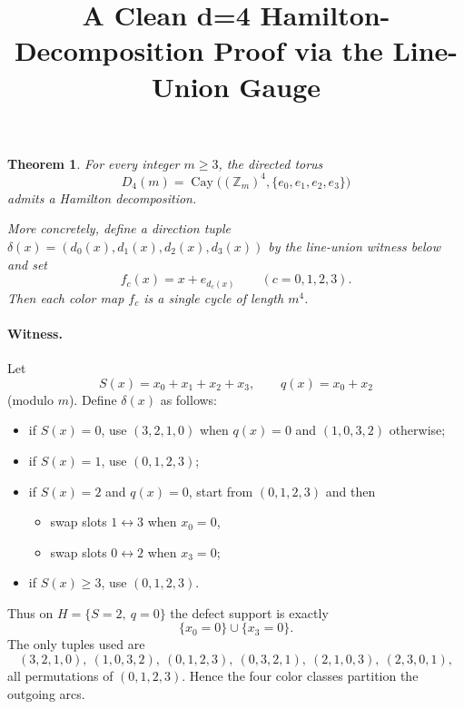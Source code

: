 \documentclass[11pt]{article}
\title{A Clean d=4 Hamilton-Decomposition Proof via the Line-Union Gauge}
\author{}
\date{}
\newtheorem{theorem}{Theorem}
\newcommand{\Zm}{\mathbb Z_m}
\begin{document}
\maketitle

\begin{theorem}
For every integer $m\ge 3$, the directed torus
\[
D_4(m)=\operatorname{Cay}\bigl((\Zm)^4,\{e_0,e_1,e_2,e_3\}\bigr)
\]
admits a Hamilton decomposition.

More concretely, define a direction tuple $\delta(x)=(d_0(x),d_1(x),d_2(x),d_3(x))$ by the line-union witness below and set
\[
f_c(x)=x+e_{d_c(x)}\qquad(c=0,1,2,3).
\]
Then each color map $f_c$ is a single cycle of length $m^4$.
\end{theorem}

\paragraph{Witness.}
Let
\[
S(x)=x_0+x_1+x_2+x_3,\qquad q(x)=x_0+x_2
\]
(modulo $m$). Define $\delta(x)$ as follows:
\begin{itemize}
    \item if $S(x)=0$, use $(3,2,1,0)$ when $q(x)=0$ and $(1,0,3,2)$ otherwise;
    \item if $S(x)=1$, use $(0,1,2,3)$;
    \item if $S(x)=2$ and $q(x)=0$, start from $(0,1,2,3)$ and then
    \begin{itemize}
        \item swap slots $1\leftrightarrow 3$ when $x_0=0$,
        \item swap slots $0\leftrightarrow 2$ when $x_3=0$;
    \end{itemize}
    \item if $S(x)\ge 3$, use $(0,1,2,3)$.
\end{itemize}
Thus on $H=\{S=2,\ q=0\}$ the defect support is exactly
\[
\{x_0=0\}\cup\{x_3=0\}.
\]
The only tuples used are
\[
(3,2,1,0),\ (1,0,3,2),\ (0,1,2,3),\ (0,3,2,1),\ (2,1,0,3),\ (2,3,0,1),
\]
all permutations of $(0,1,2,3)$. Hence the four color classes partition the outgoing arcs.
\end{document}
